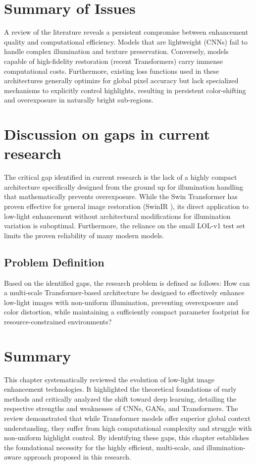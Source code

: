 \documentclass[12pt, a4paper]{report}
\begin{document}
\section{Summary of Issues}
A review of the literature reveals a persistent compromise between enhancement quality and computational efficiency. Models that are lightweight (CNNs) fail to handle complex illumination and texture preservation. Conversely, models capable of high-fidelity restoration (recent Transformers) carry immense computational costs. Furthermore, existing loss functions used in these architectures generally optimize for global pixel accuracy but lack specialized mechanisms to explicitly control highlights, resulting in persistent color-shifting and overexposure in naturally bright sub-regions.

\section{Discussion on gaps in current research}
The critical gap identified in current research is the lack of a highly compact architecture specifically designed from the ground up for illumination handling that mathematically prevents overexposure. While the Swin Transformer has proven effective for general image restoration (SwinIR \cite{liang2021swinir}), its direct application to low-light enhancement without architectural modifications for illumination variation is suboptimal. Furthermore, the reliance on the small LOL-v1 test set limits the proven reliability of many modern models.

\subsection{Problem Definition}
Based on the identified gaps, the research problem is defined as follows: How can a multi-scale Transformer-based architecture be designed to effectively enhance low-light images with non-uniform illumination, preventing overexposure and color distortion, while maintaining a sufficiently compact parameter footprint for resource-constrained environments?

\section{Summary}
This chapter systematically reviewed the evolution of low-light image enhancement technologies. It highlighted the theoretical foundations of early methods and critically analyzed the shift toward deep learning, detailing the respective strengths and weaknesses of CNNs, GANs, and Transformers. The review demonstrated that while Transformer models offer superior global context understanding, they suffer from high computational complexity and struggle with non-uniform highlight control. By identifying these gaps, this chapter establishes the foundational necessity for the highly efficient, multi-scale, and illumination-aware approach proposed in this research.
\end{document}
